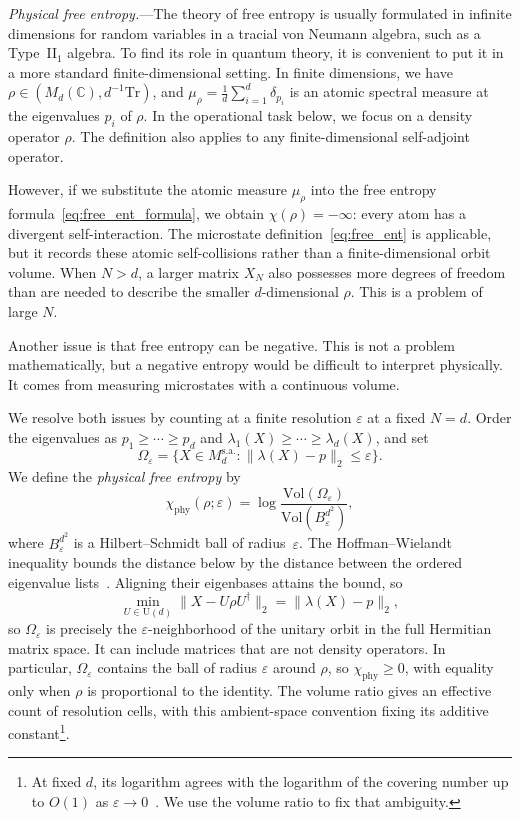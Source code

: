 \documentclass[aps,prl,twocolumn,superscriptaddress,amsmath,amssymb,reprint,longbibliography]{revtex4-2}
\def\eps{\varepsilon}
\newcommand*{\Tr}{\mathrm{Tr}}
\begin{document}
\emph{Physical free entropy.}---The theory of free entropy is usually formulated in infinite dimensions for random variables in a tracial von Neumann algebra, such as a Type~II$_1$ algebra. To find its role in quantum theory, it is convenient to put it in a more standard finite-dimensional setting. In finite dimensions, we have $\rho\in (M_d(\mathbb{C}),d^{-1}\Tr)$, and $\mu_\rho = \frac1d\sum_{i=1}^d\delta_{p_i}$ is an atomic spectral measure at the eigenvalues $p_i$ of $\rho$. In the operational task below, we focus on a density operator $\rho$. The definition also applies to any finite-dimensional self-adjoint operator.

However, if we substitute the atomic measure $\mu_\rho$ into the free entropy formula~\eqref{eq:free_ent_formula}, we obtain $\chi(\rho)=-\infty$: every atom has a divergent self-interaction. The microstate definition~\eqref{eq:free_ent} is applicable, but it records these atomic self-collisions rather than a finite-dimensional orbit volume. When $N>d$, a larger matrix $X_N$ also possesses more degrees of freedom than are needed to describe the smaller $d$-dimensional $\rho$. This is a problem of large $N$.

Another issue is that free entropy can be negative. This is not a problem mathematically, but a negative entropy would be difficult to interpret physically. It comes from measuring microstates with a continuous volume.

We resolve both issues by counting at a finite resolution $\eps$ at a fixed $N=d$. Order the eigenvalues as $p_1\ge\cdots\ge p_d$ and $\lambda_1(X)\ge\cdots\ge\lambda_d(X)$, and set
\[
\Omega_\eps=\{X\in M_d^{\mathrm{s.a.}}:\|\lambda(X)-p\|_2\le\eps\}.
\]
We define the \emph{physical free entropy} by
\begin{equation}\label{eq:free_phys_def}
    \chi_\mathrm{phy}(\rho;\eps)=\log\frac{\mathrm{Vol}(\Omega_\eps)}{\mathrm{Vol}(B_\eps^{d^2})},
\end{equation}
where $B_\eps^{d^2}$ is a Hilbert--Schmidt ball of radius~$\eps$. The Hoffman--Wielandt inequality bounds the distance below by the distance between the ordered eigenvalue lists~\cite{hoffman1953variation}. Aligning their eigenbases attains the bound, so
\[
\min_{U\in\mathrm U(d)}\|X-U\rho U^\dagger\|_2=\|\lambda(X)-p\|_2,
\]
so $\Omega_\eps$ is precisely the $\eps$-neighborhood of the unitary orbit in the full Hermitian matrix space. It can include matrices that are not density operators. In particular, $\Omega_\eps$ contains the ball of radius $\eps$ around $\rho$, so $\chi_\mathrm{phy}\ge0$, with equality only when $\rho$ is proportional to the identity. The volume ratio gives an effective count of resolution cells, with this ambient-space convention fixing its additive constant\footnote{At fixed $d$, its logarithm agrees with the logarithm of the covering number up to $O(1)$ as $\eps\to0$~\cite{Kolmogorov1963,KolmogorovTikhomirov1961}. We use the volume ratio to fix that ambiguity.}.
\end{document}
